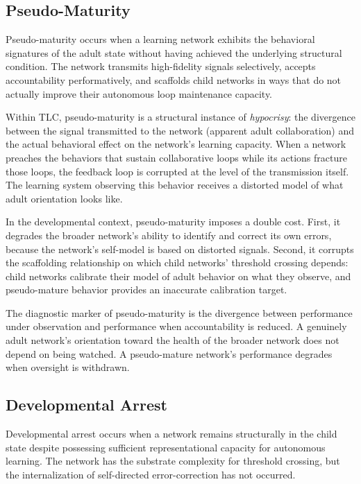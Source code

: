 \documentclass[11pt]{article}
\begin{document}
\subsection{Pseudo-Maturity}

Pseudo-maturity occurs when a learning network exhibits the behavioral signatures of the adult
state without having achieved the underlying structural condition. The network transmits
high-fidelity signals selectively, accepts accountability performatively, and scaffolds child
networks in ways that do not actually improve their autonomous loop maintenance capacity.

Within TLC, pseudo-maturity is a structural instance of \emph{hypocrisy}: the divergence between
the signal transmitted to the network (apparent adult collaboration) and the actual behavioral
effect on the network's learning capacity. When a network preaches the behaviors that sustain
collaborative loops while its actions fracture those loops, the feedback loop is corrupted at
the level of the transmission itself. The learning system observing this behavior receives a
distorted model of what adult orientation looks like.

In the developmental context, pseudo-maturity imposes a double cost. First, it degrades the
broader network's ability to identify and correct its own errors, because the network's
self-model is based on distorted signals. Second, it corrupts the scaffolding relationship on
which child networks' threshold crossing depends: child networks calibrate their model of adult
behavior on what they observe, and pseudo-mature behavior provides an inaccurate calibration
target.

The diagnostic marker of pseudo-maturity is the divergence between performance under
observation and performance when accountability is reduced. A genuinely adult network's
orientation toward the health of the broader network does not depend on being watched. A
pseudo-mature network's performance degrades when oversight is withdrawn.

\subsection{Developmental Arrest}

Developmental arrest occurs when a network remains structurally in the child state despite
possessing sufficient representational capacity for autonomous learning. The network has the
substrate complexity for threshold crossing, but the internalization of self-directed
error-correction has not occurred.
\end{document}
